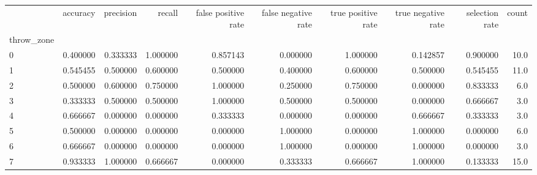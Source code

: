 \begin{tabular}{lrrrrrrrrr}
\toprule
{} &  accuracy &  precision &    recall &  false positive rate &  false negative rate &  true positive rate &  true negative rate &  selection rate &  count \\
throw\_zone &           &            &           &                      &                      &                     &                     &                 &        \\
\midrule
0          &  0.400000 &   0.333333 &  1.000000 &             0.857143 &             0.000000 &            1.000000 &            0.142857 &        0.900000 &   10.0 \\
1          &  0.545455 &   0.500000 &  0.600000 &             0.500000 &             0.400000 &            0.600000 &            0.500000 &        0.545455 &   11.0 \\
2          &  0.500000 &   0.600000 &  0.750000 &             1.000000 &             0.250000 &            0.750000 &            0.000000 &        0.833333 &    6.0 \\
3          &  0.333333 &   0.500000 &  0.500000 &             1.000000 &             0.500000 &            0.500000 &            0.000000 &        0.666667 &    3.0 \\
4          &  0.666667 &   0.000000 &  0.000000 &             0.333333 &             0.000000 &            0.000000 &            0.666667 &        0.333333 &    3.0 \\
5          &  0.500000 &   0.000000 &  0.000000 &             0.000000 &             1.000000 &            0.000000 &            1.000000 &        0.000000 &    6.0 \\
6          &  0.666667 &   0.000000 &  0.000000 &             0.000000 &             1.000000 &            0.000000 &            1.000000 &        0.000000 &    3.0 \\
7          &  0.933333 &   1.000000 &  0.666667 &             0.000000 &             0.333333 &            0.666667 &            1.000000 &        0.133333 &   15.0 \\
\bottomrule
\end{tabular}
